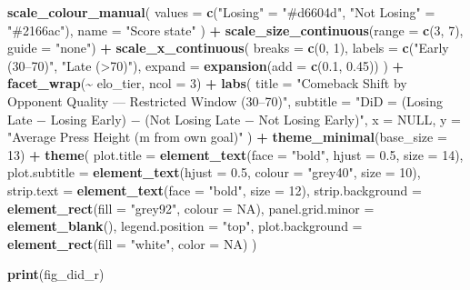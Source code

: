 \documentclass[
]{article}
\newenvironment{Shaded}{\begin{snugshade}}{\end{snugshade}}
\newcommand{\AttributeTok}[1]{\textcolor[rgb]{0.13,0.29,0.53}{#1}}
\newcommand{\ConstantTok}[1]{\textcolor[rgb]{0.56,0.35,0.01}{#1}}
\newcommand{\DecValTok}[1]{\textcolor[rgb]{0.00,0.00,0.81}{#1}}
\newcommand{\FloatTok}[1]{\textcolor[rgb]{0.00,0.00,0.81}{#1}}
\newcommand{\FunctionTok}[1]{\textcolor[rgb]{0.13,0.29,0.53}{\textbf{#1}}}
\newcommand{\NormalTok}[1]{#1}
\newcommand{\OtherTok}[1]{\textcolor[rgb]{0.56,0.35,0.01}{#1}}
\newcommand{\SpecialCharTok}[1]{\textcolor[rgb]{0.81,0.36,0.00}{\textbf{#1}}}
\newcommand{\StringTok}[1]{\textcolor[rgb]{0.31,0.60,0.02}{#1}}
\begin{document}
\begin{Shaded}
\begin{Highlighting}[]
  \FunctionTok{scale\_colour\_manual}\NormalTok{(}
    \AttributeTok{values =} \FunctionTok{c}\NormalTok{(}\StringTok{"Losing"} \OtherTok{=} \StringTok{"\#d6604d"}\NormalTok{, }\StringTok{"Not Losing"} \OtherTok{=} \StringTok{"\#2166ac"}\NormalTok{),}
    \AttributeTok{name   =} \StringTok{"Score state"}
\NormalTok{  ) }\SpecialCharTok{+}
  \FunctionTok{scale\_size\_continuous}\NormalTok{(}\AttributeTok{range =} \FunctionTok{c}\NormalTok{(}\DecValTok{3}\NormalTok{, }\DecValTok{7}\NormalTok{), }\AttributeTok{guide =} \StringTok{"none"}\NormalTok{) }\SpecialCharTok{+}
  \FunctionTok{scale\_x\_continuous}\NormalTok{(}
    \AttributeTok{breaks =} \FunctionTok{c}\NormalTok{(}\DecValTok{0}\NormalTok{, }\DecValTok{1}\NormalTok{),}
    \AttributeTok{labels =} \FunctionTok{c}\NormalTok{(}\StringTok{"Early (30–70\textquotesingle{})"}\NormalTok{, }\StringTok{"Late (\textgreater{}70\textquotesingle{})"}\NormalTok{),}
    \AttributeTok{expand =} \FunctionTok{expansion}\NormalTok{(}\AttributeTok{add =} \FunctionTok{c}\NormalTok{(}\FloatTok{0.1}\NormalTok{, }\FloatTok{0.45}\NormalTok{))}
\NormalTok{  ) }\SpecialCharTok{+}
  \FunctionTok{facet\_wrap}\NormalTok{(}\SpecialCharTok{\textasciitilde{}}\NormalTok{ elo\_tier, }\AttributeTok{ncol =} \DecValTok{3}\NormalTok{) }\SpecialCharTok{+}
  \FunctionTok{labs}\NormalTok{(}
    \AttributeTok{title    =} \StringTok{"Comeback Shift by Opponent Quality — Restricted Window (30–70\textquotesingle{})"}\NormalTok{,}
    \AttributeTok{subtitle =} \StringTok{"DiD = (Losing Late − Losing Early) − (Not Losing Late − Not Losing Early)"}\NormalTok{,}
    \AttributeTok{x        =} \ConstantTok{NULL}\NormalTok{,}
    \AttributeTok{y        =} \StringTok{"Average Press Height (m from own goal)"}
\NormalTok{  ) }\SpecialCharTok{+}
  \FunctionTok{theme\_minimal}\NormalTok{(}\AttributeTok{base\_size =} \DecValTok{13}\NormalTok{) }\SpecialCharTok{+}
  \FunctionTok{theme}\NormalTok{(}
    \AttributeTok{plot.title       =} \FunctionTok{element\_text}\NormalTok{(}\AttributeTok{face =} \StringTok{"bold"}\NormalTok{, }\AttributeTok{hjust =} \FloatTok{0.5}\NormalTok{, }\AttributeTok{size =} \DecValTok{14}\NormalTok{),}
    \AttributeTok{plot.subtitle    =} \FunctionTok{element\_text}\NormalTok{(}\AttributeTok{hjust =} \FloatTok{0.5}\NormalTok{, }\AttributeTok{colour =} \StringTok{"grey40"}\NormalTok{, }\AttributeTok{size =} \DecValTok{10}\NormalTok{),}
    \AttributeTok{strip.text       =} \FunctionTok{element\_text}\NormalTok{(}\AttributeTok{face =} \StringTok{"bold"}\NormalTok{, }\AttributeTok{size =} \DecValTok{12}\NormalTok{),}
    \AttributeTok{strip.background =} \FunctionTok{element\_rect}\NormalTok{(}\AttributeTok{fill =} \StringTok{"grey92"}\NormalTok{, }\AttributeTok{colour =} \ConstantTok{NA}\NormalTok{),}
    \AttributeTok{panel.grid.minor =} \FunctionTok{element\_blank}\NormalTok{(),}
    \AttributeTok{legend.position  =} \StringTok{"top"}\NormalTok{,}
    \AttributeTok{plot.background  =} \FunctionTok{element\_rect}\NormalTok{(}\AttributeTok{fill =} \StringTok{"white"}\NormalTok{, }\AttributeTok{color =} \ConstantTok{NA}\NormalTok{)}
\NormalTok{  )}

\FunctionTok{print}\NormalTok{(fig\_did\_r)}
\end{Highlighting}
\end{Shaded}
\end{document}
